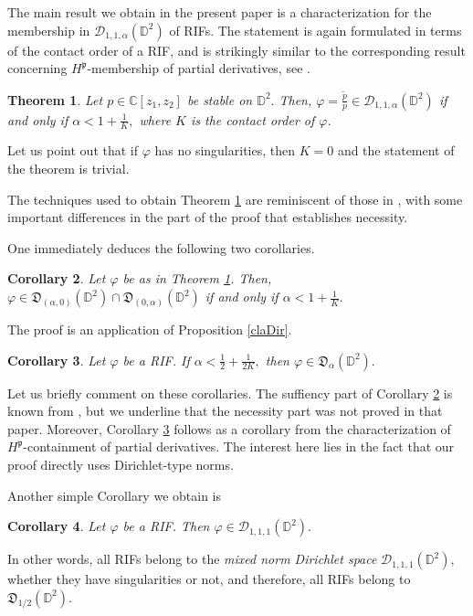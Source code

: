 \documentclass[11pt]{amsart}
\newtheorem{theorem}{Theorem}[section]
\newtheorem{corollary}[theorem]{Corollary}
\numberwithin{equation}{section}
\begin{document}
The main result we obtain in the present paper is a characterization for the membership in $\mathcal{D}_{1,1,\alpha}(\mathbb{D}^2)$ of RIFs. The statement is again formulated in terms of the contact order of a RIF, and is strikingly similar to the corresponding result concerning $H^{\mathfrak{p}}$-membership of partial derivatives, see \cite[Theorem 4.1]{PLMS}. 

\begin{theorem} Let $p\in\mathbb{C}[z_1,z_2]$ be stable on $\mathbb{D}^2.$  Then, $\varphi=\frac{\tilde{p}}{p}\in \mathcal{D}_{1,1,\alpha}(\mathbb{D}^2)$ if and only if $\alpha<1+\frac{1}{K},$ where $K$ is the contact order of $\varphi$.
\label{membership}
\end{theorem}
Let us point out that if $\varphi$ has no singularities, then $K=0$ and the statement of the theorem is trivial. 

The techniques used to obtain Theorem \ref{membership} are reminiscent of those in \cite{PLMS}, with some important differences in the part of the proof that establishes necessity.

One immediately deduces the following two corollaries.
\begin{corollary} Let $\varphi$ be as in Theorem \ref{membership}. Then, $\varphi\in \mathfrak{D}_{(\alpha,0)}(\mathbb{D}^2)\cap \mathfrak{D}_{(0,\alpha)}(\mathbb{D}^2)$ if and only if $\alpha<1+\frac{1}{K}.$
\label{anisotropicchar}
\end{corollary}
The proof is an application of Proposition \ref{claDir}.
\begin{corollary} Let $\varphi$ be a RIF. If $\alpha<\frac{1}{2}+\frac{1}{2K},$ then $\varphi\in \mathfrak{D}_{\alpha}(\mathbb{D}^2).$
\label{sufficient0}
\end{corollary}
Let us briefly comment on these corollaries. The suffiency part of Corollary \ref{anisotropicchar} is known from \cite{PLMS}, but we underline that the necessity part was not proved in that paper. Moreover, Corollary \ref{sufficient0} follows as a corollary from the characterization of $H^{\mathfrak{p}}$-containment of partial derivatives. The interest here lies in the fact that our proof directly uses Dirichlet-type norms. 

Another simple Corollary we obtain is
\begin{corollary} Let $\varphi$ be a RIF. Then $\varphi \in \mathcal{D}_{1,1,1}(\mathbb{D}^2).$
\label{easy}
\end{corollary}

In other words, all RIFs belong to the \textit{mixed norm Dirichlet space} $\mathcal{D}_{1,1,1}(\mathbb{D}^2),$ whether they have singularities or not, and therefore, all RIFs belong to $\mathfrak{D}_{1/2}(\mathbb{D}^2).$ 
\end{document}
